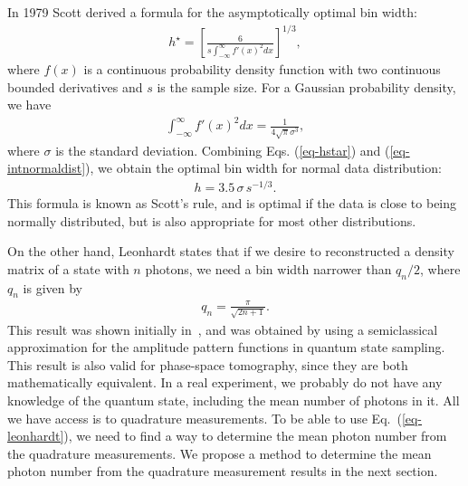 \documentclass[
reprint,
superscriptaddress,
showpacs,
amsmath,
amssymb,
aps,
pra,
longbibliography
]{revtex4-1}
\begin{document}
In 1979 Scott derived a formula for the asymptotically optimal bin width:
\begin{eqnarray}
h^{\star} = \left[ \frac{6}{s \int_{-\infty}^{\infty} f'(x)^2 dx} \right]^{1/3},
\label{eq-hstar}
\end{eqnarray}
where $f(x)$ is a continuous probability density function with two continuous bounded derivatives and $s$ is the sample size. For a Gaussian probability density, we have
\begin{eqnarray}
\int_{-\infty}^{\infty} f'(x)^2 dx = \frac{1}{4 \sqrt{\pi} \sigma ^3},
\label{eq-intnormaldist}
\end{eqnarray}
where $\sigma$ is the standard deviation. Combining Eqs. (\ref{eq-hstar}) and (\ref{eq-intnormaldist}), we obtain the optimal bin width for normal data distribution:
\begin{eqnarray}
h = 3.5 \, \sigma \, s^{-1/3}.
\end{eqnarray}
This formula is known as Scott's rule, and is optimal if the data is close to being normally distributed, but is also appropriate for most other distributions. 

On the other hand, Leonhardt states that if we desire to reconstructed a density matrix of a state with $n$ photons, we need a bin width narrower than $q_n/2$, where $q_n$ is given by
\begin{eqnarray}
q_n = \frac{\pi}{\sqrt{2 n + 1}}.
\label{eq-leonhardt}
\end{eqnarray}
This result was shown initially in~\cite{Leonhardt1996}, and was obtained by using a semiclassical approximation for the amplitude pattern functions in quantum state
sampling. This result is also valid for phase-space tomography, since they are both 
mathematically equivalent. In a real experiment, we probably do not have any knowledge of the quantum state, including the mean number of photons in it. All we have access is to quadrature measurements. To be able to use Eq.~(\ref{eq-leonhardt}), we need to find a way to determine the mean photon number from the quadrature measurements. We propose a method to determine the mean photon number from the quadrature measurement results in the next section. 
\end{document}
